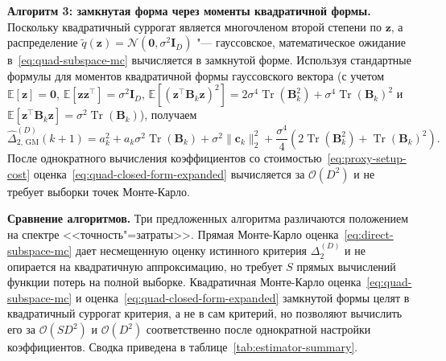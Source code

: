 \textbf{Алгоритм 3: замкнутая форма через моменты квадратичной формы.} Поскольку квадратичный суррогат является многочленом второй степени по $\mathbf z$, а распределение $\tilde q(\mathbf z)=\mathcal N(\mathbf 0,\sigma^2 \mathbf I_D)$ "--- гауссовское, математическое ожидание в~\eqref{eq:quad-subspace-mc} вычисляется в замкнутой форме. Используя стандартные формулы для моментов квадратичной формы гауссовского вектора (с учетом $\mathbb E[\mathbf z]=\mathbf 0$, $\mathbb E[\mathbf z\mathbf z^\top]=\sigma^2 \mathbf I_D$, $\mathbb E[(\mathbf z^\top \mathbf B_k \mathbf z)^2]=2\sigma^4 \operatorname{Tr}(\mathbf B_k^2)+\sigma^4 \operatorname{Tr}(\mathbf B_k)^2$ и $\mathbb E[\mathbf z^\top \mathbf B_k \mathbf z]=\sigma^2 \operatorname{Tr}(\mathbf B_k)$), получаем
\begin{equation}
    \label{eq:quad-closed-form-expanded}
    \widehat \Delta_{2,\,\mathrm{GM}}^{(D)}(k+1)
    =
    a_k^2
    +
    a_k \sigma^2 \operatorname{Tr}(\mathbf B_k)
    +
    \sigma^2 \|\mathbf c_k\|_2^2
    +
    \frac{\sigma^4}{4}
    \left(
        2\operatorname{Tr}(\mathbf B_k^2)
        +
        \operatorname{Tr}(\mathbf B_k)^2
    \right).
\end{equation}
После однократного вычисления коэффициентов со стоимостью~\eqref{eq:proxy-setup-cost} оценка~\eqref{eq:quad-closed-form-expanded} вычисляется за $\mathcal O(D^2)$ и не требует выборки точек Монте-Карло.

\textbf{Сравнение алгоритмов.} Три предложенных алгоритма различаются положением на спектре <<точность"=затраты>>. Прямая Монте-Карло оценка~\eqref{eq:direct-subspace-mc} дает несмещенную оценку истинного критерия $\Delta_2^{(D)}$ и не опирается на квадратичную аппроксимацию, но требует $S$ прямых вычислений функции потерь на полной выборке. Квадратичная Монте-Карло оценка~\eqref{eq:quad-subspace-mc} и оценка~\eqref{eq:quad-closed-form-expanded} замкнутой формы целят в квадратичный суррогат критерия, а не в сам критерий, но позволяют вычислить его за $\mathcal O(SD^2)$ и $\mathcal O(D^2)$ соответственно после однократной настройки коэффициентов. Сводка приведена в таблице~\ref{tab:estimator-summary}.

